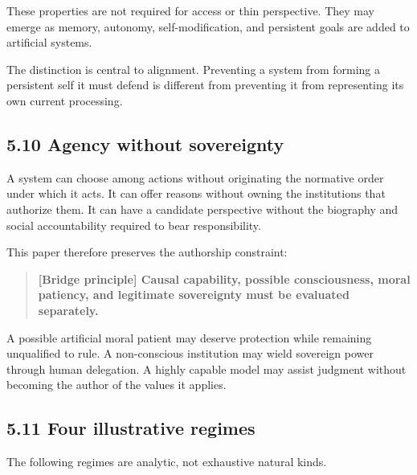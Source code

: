 \documentclass[
  11pt,
]{article}
\begin{document}
These properties are not required for access or thin perspective. They
may emerge as memory, autonomy, self-modification, and persistent goals
are added to artificial systems.

The distinction is central to alignment. Preventing a system from
forming a persistent self it must defend is different from preventing it
from representing its own current processing.

\subsection{5.10 Agency without
sovereignty}\label{agency-without-sovereignty}

A system can choose among actions without originating the normative
order under which it acts. It can offer reasons without owning the
institutions that authorize them. It can have a candidate perspective
without the biography and social accountability required to bear
responsibility.

This paper therefore preserves the authorship constraint:

\begin{quote}
\textbf{{[}Bridge principle{]} Causal capability, possible
consciousness, moral patiency, and legitimate sovereignty must be
evaluated separately.}
\end{quote}

A possible artificial moral patient may deserve protection while
remaining unqualified to rule. A non-conscious institution may wield
sovereign power through human delegation. A highly capable model may
assist judgment without becoming the author of the values it applies.

\subsection{5.11 Four illustrative
regimes}\label{four-illustrative-regimes}

The following regimes are analytic, not exhaustive natural kinds.
\end{document}

